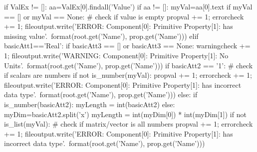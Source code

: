 \begin{MyVerbatim}
                if ValEx != []:
                    aa=ValEx[0].findall('Value')
                    if aa != []:
                        myVal=aa[0].text
                        if myVal == [] or myVal == None:                        # check if value is empty
                            propval += 1;
                            errorcheck += 1;
                            fileoutput.write('ERROR: Component[{0}]: 
                             Primitive Property[{1}]: has missing value\n'.\
                                format(root.get('Name'), prop.get('Name')))
                        elif basicAtt1=='Real':
                            if basicAtt3 == [] or basicAtt3 == None:
                                warningcheck += 1;
                                fileoutput.write('WARNING: Component[{0}]: 
                                 Primitive Property[{1}]: No Units\n'.\
                                    format(root.get('Name'), prop.get('Name')))
                            if basicAtt2 ==  
                             '1':                                # check if 
                                             scalars are numbers
                                if not is_number(myVal):
                                    propval += 1;
                                    errorcheck += 1;
                                    fileoutput.write('ERROR: 
                                     Component[{0}]: Primitive 
                                      Property[{1}]: has incorrect data 
                                       type\n'.\
                                        format(root.get('Name'), prop.get('Name')))
                            else:
                                if is_number(basicAtt2):
                                    myLength = int(basicAtt2)
                                else:
                                    myDim=basicAtt2.split('x')
                                    myLength = int(myDim[0]) * int(myDim[1])
                                if not 
                                 is_list(myVal):                          # 
                                  check if matrix/vector is all numbers
                                    propval += 1;
                                    errorcheck += 1;
                                    fileoutput.write('ERROR: 
                                     Component[{0}]: Primitive 
                                      Property[{1}]: has incorrect data 
                                       type\n'.\
                                        format(root.get('Name'), prop.get('Name')))

\end{MyVerbatim}
